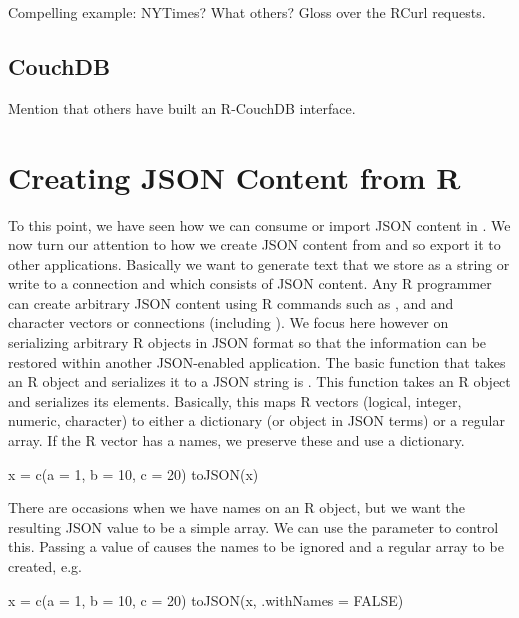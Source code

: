 \documentclass[article]{jss}
\begin{document}
Compelling example: NYTimes? What others?
Gloss over the RCurl requests.

\subsection{CouchDB}

Mention that others have built an R-CouchDB interface.

\section{Creating JSON Content from R}

To this point, we have seen how we can consume or import JSON
content in . We now turn our attention to how we 
create JSON content from  and so export it to other applications.
Basically we want to generate text that we store as a string
or write to a connection and which consists of JSON content.
Any R programmer can create arbitrary JSON content  using R commands
such as ,  and 
and character vectors or connections (including ).
We focus here however on serializing arbitrary R objects in JSON format
so that the information can be restored within another  JSON-enabled application.
The basic function that takes an R object and serializes it to a JSON string
is .
This function takes an R object and serializes its elements.
Basically, this maps R vectors (logical, integer, numeric, character)
to either a dictionary (or object in JSON terms) or a regular array. 
If the R vector has a names, we preserve these and use a dictionary.
\begin{CodeChunk}
\begin{CodeInput}
x = c(a = 1, b = 10, c = 20)
toJSON(x)
\end{CodeInput}
\end{CodeChunk}
There are occasions when we have  names on an R object, but 
we want the resulting JSON value to be a simple array.
We can use the  parameter to control this.
Passing a value of \SFALSE{} causes the names to be ignored and a regular array 
to be created, e.g.
\begin{CodeChunk}
\begin{CodeInput}
x = c(a = 1, b = 10, c = 20)
toJSON(x, .withNames = FALSE)
\end{CodeInput}
\end{CodeChunk}
\end{document}
